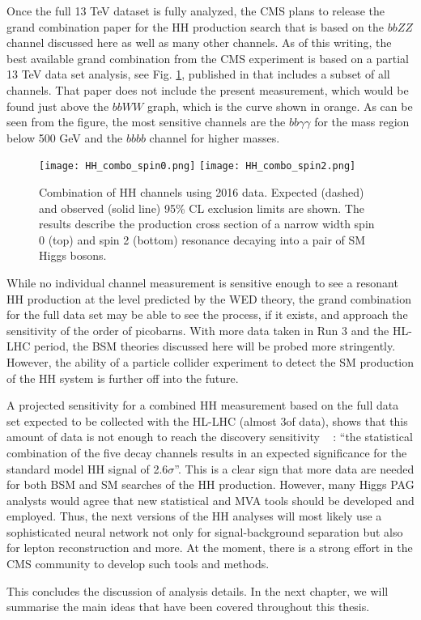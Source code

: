 Once the full 13 TeV dataset is fully analyzed, the CMS plans to release the grand combination paper for the HH production search that is based on the $bbZZ$ channel discussed here as well as many other channels. As of this writing, the best available grand combination from the CMS experiment is based on a partial 13 TeV data set analysis, see Fig. \ref{HH_combo}, published in \cite{HH_combo} that includes a subset of all channels. That paper does not include the present measurement, which would be found just above the $bbWW$ graph, which is the curve shown in orange. As can be seen from the figure, the most sensitive channels are the $bb\gamma\gamma$ for the mass region below 500 GeV and the $bbbb$ channel for higher masses.

\begin{figure}[H]%
\begin{center}
\texttt{[image: HH\_combo\_spin0.png]}
\texttt{[image: HH\_combo\_spin2.png]}
\caption{ Combination of HH channels using 2016 data. Expected (dashed) and observed (solid line) 95\% CL exclusion limits are shown. The results describe the production cross section of a narrow width spin 0 (top) and spin 2 (bottom) resonance decaying into a pair of SM Higgs bosons. }
\label{HH_combo}
\end{center}
\end{figure}

While no individual channel measurement is sensitive enough to see a resonant HH production at the level predicted by the WED theory, the grand combination for the full data set may be able to see the process, if it exists, and approach the sensitivity of the order of picobarns. With more data taken in Run 3 and the HL-LHC period, the BSM theories discussed here will be probed more stringently. However, the ability of a particle collider experiment to detect the SM production of the HH system is further off into the future.

A projected sensitivity for a combined HH measurement based on the full data set expected to be collected with the HL-LHC (almost 3\abinv of data), shows that this amount of data is not enough to reach the discovery sensitivity ~\cite{CMS-PAS-FTR-18-019} : ``the statistical combination of the five decay channels results in an expected significance for the standard model HH signal of 2.6$\sigma$''. This is a clear sign that more data are needed for both BSM and SM searches of the HH production. However, many Higgs PAG analysts would agree that new statistical and MVA tools should be developed and employed. Thus, the next versions of the HH analyses will most likely use a sophisticated neural network not only for signal-background separation but also for lepton reconstruction and more. At the moment, there is a strong effort in the CMS community to develop such tools and methods. 

This concludes the discussion of analysis details. In the next chapter, we will summarise the main ideas that have been covered throughout this thesis. 





